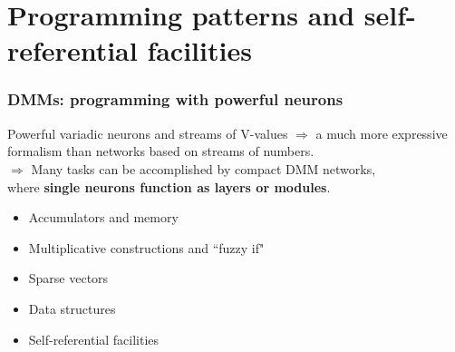 \documentclass{beamer}
\newcommand{\msmagenta}[1]{{\color{mymagenta} #1}}
\begin{document}
\section{Programming patterns and self-referential facilities}




\begin{frame}

  \frametitle{\msmagenta{DMMs: programming with powerful neurons}}

Powerful variadic neurons and streams of V-values $\Rightarrow$ a much more expressive formalism
 than networks based on streams of numbers.\\[2ex]

$\Rightarrow$ Many tasks can be accomplished by \msmagenta{compact DMM networks},\\
 where {\bf single neurons function as layers or modules}.

\hrulefill

\begin{itemize}

\item \msmagenta{Accumulators and memory}

\item Multiplicative constructions and ``fuzzy if"

\item \msmagenta{Sparse vectors}

\item Data structures

\item Self-referential facilities

\end{itemize}






\end{frame}
\end{document}
